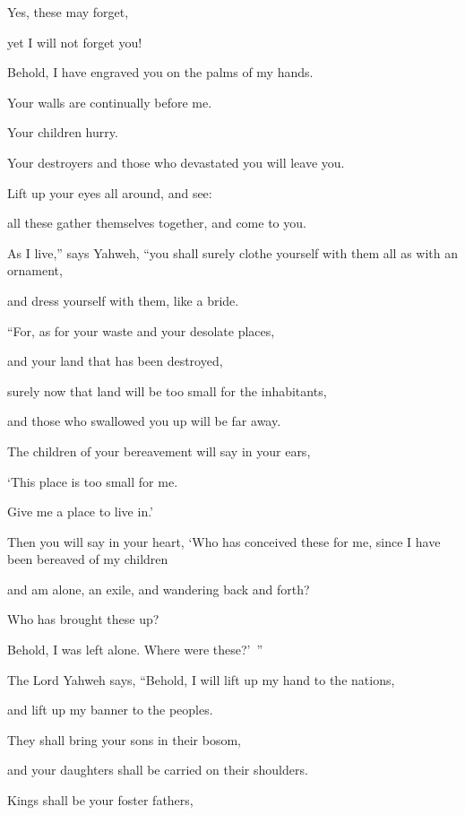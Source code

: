 {\par }{\Q Yes, these may forget,
\par }{\QB yet I will not forget you!
\par }{\Q {}Behold, I have engraved you on the palms of my hands.
\par }{\QB Your walls are continually before me.
\par }{\Q {}Your children hurry.
\par }{\QB Your destroyers and those who devastated you will leave you.
\par }{\Q {}Lift up your eyes all around, and see:
\par }{\QB all these gather themselves together, and come to you.
\par }{\Q As I live,” says Yahweh, “you shall surely clothe yourself with them all as with an ornament,
\par }{\QB and dress yourself with them, like a bride.
\par }{\Q {}“For, as for your waste and your desolate places,
\par }{\QB and your land that has been destroyed,
\par }{\Q surely now that land will be too small for the inhabitants,
\par }{\QB and those who swallowed you up will be far away.
\par }{\Q {}The children of your bereavement will say in your ears,
\par }{\QB ‘This place is too small for me.
\par }{\QB Give me a place to live in.’
\par }{\Q {}Then you will say in your heart, ‘Who has conceived these for me, since I have been bereaved of my children
\par }{\QB and am alone, an exile, and wandering back and forth?
\par }{\Q Who has brought these up?
\par }{\QB Behold, I was left alone. Where were these?’ ”
\par }{\BB \par }{\Q {}The Lord Yahweh says, “Behold, I will lift up my hand to the nations,
\par }{\QB and lift up my banner to the peoples.
\par }{\Q They shall bring your sons in their bosom,
\par }{\QB and your daughters shall be carried on their shoulders.
\par }{\Q {}Kings shall be your foster fathers,
}
